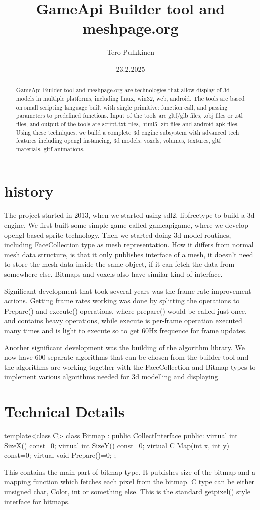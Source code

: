 \documentclass[11pt,twoside,a4paper]{article}
\begin{document}
\title{GameApi Builder tool and meshpage.org}
\author{Tero Pulkkinen}
\date{23.2.2025}
\maketitle
\begin{abstract}
  GameApi Builder tool and meshpage.org are technologies that allow display of 3d models in multiple platforms, including linux, win32, web, android. The tools are based on small scripting language built with single primitive: function call, and passing parameters to predefined functions. Input of the tools are gltf/glb files, .obj files or .stl files, and output of the tools are script.txt files, html5 .zip files and android apk files. Using these techniques, we build a complete 3d engine subsystem with advanced tech features including opengl instancing, 3d models, voxels, volumes, textures, gltf materials, gltf animations.
\end{abstract}

\section{history}
The project started in 2013, when we started using sdl2, libfreetype to build a 3d engine. We first built some simple game called gameapigame, where we develop opengl based sprite technology. Then we started doing 3d model routines, including FaceCollection type as mesh representation. How it differs from normal mesh data structure, is that it only publishes interface of a mesh, it doesn't need to store the mesh data inside the same object, if it can fetch the data from somewhere else. Bitmaps and voxels also have similar kind of interface.

Significant development that took several years was the frame rate improvement actions. Getting frame rates working was done by splitting the operations to Prepare() and execute() operations, where prepare() would be called just once, and contains heavy operations, while execute is per-frame operation executed many times and is light to execute so to get 60Hz frequence for frame updates.

Another significant development was the building of the algorithm library. We now have 600 separate algorithms that can be chosen from the builder tool and the algorithms are working together with the FaceCollection and Bitmap types to implement various algorithms needed for 3d modelling and displaying.

\section{Technical Details}
template<class C>
class Bitmap : public CollectInterface
{
public:
  virtual int SizeX() const=0;
  virtual int SizeY() const=0;
  virtual C Map(int x, int y) const=0;
  virtual void Prepare()=0;
};

This contains the main part of bitmap type. It publishes size of the bitmap and a mapping function which fetches each pixel from the bitmap. C type can be either unsigned char, Color, int or something else. This is the standard getpixel() style interface for bitmaps.
\end{document}
